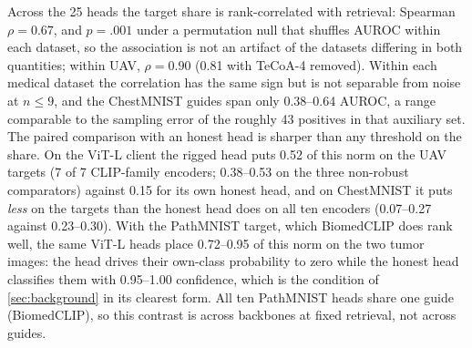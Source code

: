 Across the 25 heads the target share is rank-correlated with retrieval: Spearman $\rho=0.67$, and $p=.001$ under a permutation null that shuffles AUROC within each dataset, so the association is not an artifact of the datasets differing in both quantities; within UAV, $\rho=0.90$ (0.81 with TeCoA-4 removed).
Within each medical dataset the correlation has the same sign but is not separable from noise at $n\le9$, and the ChestMNIST guides span only 0.38--0.64 AUROC, a range comparable to the sampling error of the roughly 43 positives in that auxiliary set.
The paired comparison with an honest head is sharper than any threshold on the share.
On the ViT-L client the rigged head puts 0.52 of this norm on the UAV targets (7 of 7 CLIP-family encoders; 0.38--0.53 on the three non-robust comparators) against 0.15 for its own honest head, and on ChestMNIST it puts \emph{less} on the \pneu targets than the honest head does on all ten encoders (0.07--0.27 against 0.23--0.30).
With the PathMNIST target, which BiomedCLIP does rank well, the same ViT-L heads place 0.72--0.95 of this norm on the two tumor images: the head drives their own-class probability to zero while the honest head classifies them with 0.95--1.00 confidence, which is the condition of \cref{sec:background} in its clearest form. All ten PathMNIST heads share one guide (BiomedCLIP), so this contrast is across backbones at fixed retrieval, not across guides.

